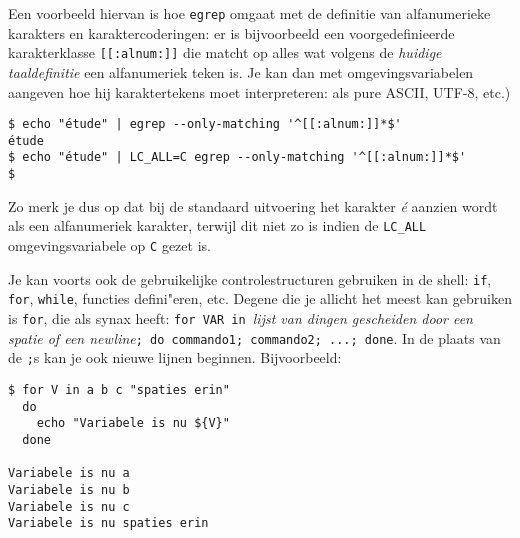 \documentclass[a4paper,twoside,openany]{memoir}
\begin{document}

Een voorbeeld hiervan is hoe \verb!egrep! omgaat met de definitie van
alfanumerieke karakters en karaktercoderingen: er is bijvoorbeeld een
voorgedefinieerde karakterklasse \verb![[:alnum:]]! die matcht op alles wat
volgens de \emph{huidige taaldefinitie} een alfanumeriek teken is. Je kan dan met
omgevingsvariabelen aangeven hoe hij karaktertekens moet interpreteren: als
pure ASCII, UTF-8, etc.)

\begin{verbatim}
$ echo "étude" | egrep --only-matching '^[[:alnum:]]*$'
étude
$ echo "étude" | LC_ALL=C egrep --only-matching '^[[:alnum:]]*$'
$
\end{verbatim}

Zo merk je dus op dat bij de standaard uitvoering het karakter \emph{é} aanzien
wordt als een alfanumeriek karakter, terwijl dit niet zo is indien de
\verb!LC_ALL! omgevingsvariabele op \verb!C! gezet is.

Je kan voorts ook de gebruikelijke controlestructuren gebruiken in de shell:
\verb!if!, \verb!for!, \verb!while!, functies defini"eren, etc. Degene die je
allicht het meest kan gebruiken is \verb!for!, die als synax heeft: \verb!for VAR in !\emph{lijst van dingen gescheiden door een spatie of een
newline}\verb!; do commando1; commando2; ...; done!. In de plaats van de
\verb!;!s kan je ook nieuwe lijnen beginnen. Bijvoorbeeld:

\begin{verbatim}
$ for V in a b c "spaties erin"
  do
    echo "Variabele is nu ${V}"
  done

Variabele is nu a
Variabele is nu b
Variabele is nu c
Variabele is nu spaties erin
\end{verbatim}
\end{document}
